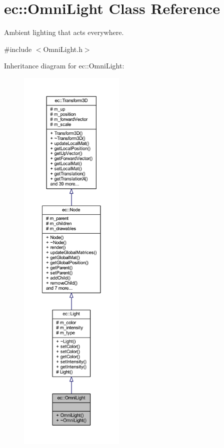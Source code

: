 \hypertarget{classec_1_1_omni_light}{}\section{ec\+:\+:Omni\+Light Class Reference}
\label{classec_1_1_omni_light}


Ambient lighting that acts everywhere.  




{\ttfamily \#include $<$Omni\+Light.\+h$>$}



Inheritance diagram for ec\+:\+:Omni\+Light\+:\nopagebreak
\begin{figure}[H]
\begin{center}
\leavevmode
\includegraphics[height=550pt]{classec_1_1_omni_light__inherit__graph}
\end{center}
\end{figure}


